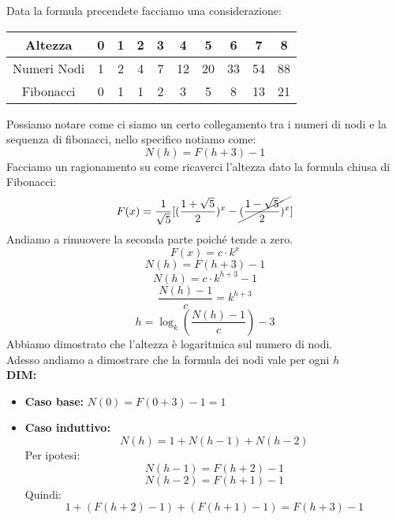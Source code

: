 Data la formula precendete facciamo una considerazione:\\
\begin{center}
    \begin{tabular}{|c|c|c|c|c|c|c|c|c|c|} %
        \hline
        Altezza & 0 & 1 & 2 & 3 & 4 & 5 & 6 & 7 & 8 \\
        \hline
        Numeri Nodi & 1 & 2 & 4 & 7 & 12 & 20 & 33 & 54 & 88 \\
        \hline
        Fibonacci & 0 & 1 & 1 & 2 & 3 & 5 & 8 & 13 & 21 \\
        \hline
    \end{tabular}
\end{center}

Possiamo notare come ci siamo un certo collegamento tra i numeri di nodi e la sequenza di fibonacci, nello specifico notiamo come:
$$ N(h) = F(h+3)-1$$
Facciamo un ragionamento su come ricaverci l'altezza dato  la formula chiusa di Fibonacci:
$$ F(x)= \frac{1}{\sqrt{5}} [(\frac{1+\sqrt{5}}{2})^x - \cancel{(\frac{1-\sqrt{5}}{2})^x}]  $$
Andiamo a rimuovere la seconda parte poiché tende a zero.\\
$$ F(x)=c \cdot k^x $$
$$ N(h) = F(h+3)-1 $$
$$ N(h) = c \cdot k^{h+3}-1$$
$$ \frac{N(h)-1}{c} = k^{h+3} $$ 
$$ h =  \log_k (\frac{N(h)-1}{c}) -3 $$
Abbiamo dimostrato che l'altezza è logaritmica sul numero di nodi.\\
Adesso andiamo a dimostrare che la formula dei nodi vale per ogni $h$\\
\textbf{DIM:}
\begin{itemize}
    \item \textbf{Caso base:} $N(0) = F(0+3) - 1 = 1$
    \item \textbf{Caso induttivo:}
    \[
    N(h) = 1 + N(h-1) + N(h-2)
    \]
    Per ipotesi:
    \[
    N(h-1) = F(h+2) - 1
    \]
    \[
    N(h-2) = F(h+1) - 1
    \]
    Quindi:
    \[
    1 + (F(h+2) - 1) + (F(h+1) - 1) = F(h+3) - 1
    \]
\end{itemize}
